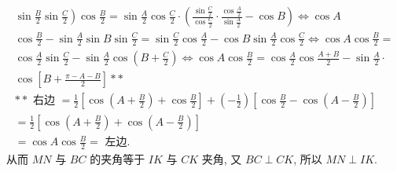 $$
\begin{gathered}
\left.\sin \frac{B}{2} \sin \frac{C}{2}\right) \cos \frac{B}{2}=\sin \frac{A}{2} \cos \frac{C}{2} \cdot\left(\frac{\sin \frac{C}{2}}{\cos \frac{C}{2}} \cdot \frac{\cos \frac{A}{2}}{\sin \frac{A}{2}}-\cos B\right) \Leftrightarrow \cos A \\
\cos \frac{B}{2}-\sin \frac{A}{2} \sin B \sin \frac{C}{2}=\sin \frac{C}{2} \cos \frac{A}{2}-\cos B \sin \frac{A}{2} \cos \frac{C}{2} \Leftrightarrow \cos A \cos \frac{B}{2}= \\
\cos \frac{A}{2} \sin \frac{C}{2}-\sin \frac{A}{2} \cos \left(B+\frac{C}{2}\right) \Leftrightarrow \cos A \cos \frac{B}{2}=\cos \frac{A}{2} \cos \frac{A+B}{2}-\sin \frac{A}{2} \cdot \\
\cos \left[B+\frac{\pi-A-B}{2}\right] * * \\
* * \text { 右边 }=\frac{1}{2}\left[\cos \left(A+\frac{B}{2}\right)+\cos \frac{B}{2}\right]+\left(-\frac{1}{2}\right)\left[\cos \frac{B}{2}-\cos \left(A-\frac{B}{2}\right)\right] \\
=\frac{1}{2}\left[\cos \left(A+\frac{B}{2}\right)+\cos \left(A-\frac{B}{2}\right)\right] \\
=\cos A \cos \frac{B}{2}=\text { 左边.
}
\end{gathered}
$$
从而 $M N$ 与 $B C$ 的夹角等于 $I K$ 与 $C K$ 夹角, 又 $B C \perp C K$, 所以 $M N \perp I K$.


